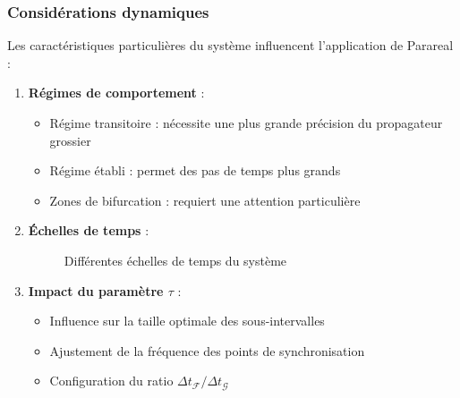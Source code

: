 \subsubsection{Considérations dynamiques}
Les caractéristiques particulières du système influencent l'application de Parareal :

\begin{enumerate}
    \item \textbf{Régimes de comportement} :
    \begin{itemize}
        \item Régime transitoire : nécessite une plus grande précision du propagateur grossier
        \item Régime établi : permet des pas de temps plus grands
        \item Zones de bifurcation : requiert une attention particulière
    \end{itemize}

    \item \textbf{Échelles de temps} :
    \begin{figure}[h]
        \centering
        \caption{Différentes échelles de temps du système}
        \label{fig:echelles_temps}
    \end{figure}
    
    \item \textbf{Impact du paramètre $\tau$} :
    \begin{itemize}
        \item Influence sur la taille optimale des sous-intervalles
        \item Ajustement de la fréquence des points de synchronisation
        \item Configuration du ratio $\Delta t_{\mathcal{F}}/\Delta t_{\mathcal{G}}$
    \end{itemize}
\end{enumerate}

